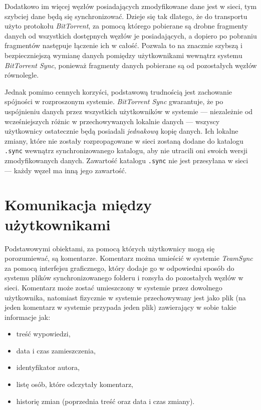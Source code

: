 \documentclass[polish,a4paper,twoside]{ppfcmthesis}
\begin{document}
Dodatkowo im więcej węzłów posiadających zmodyfikowane dane jest w sieci, tym szybciej dane będą się synchronizować. Dzieje się tak dlatego, że do transportu użyto protokołu \emph{BitTorrent}, za pomocą którego pobierane są drobne fragmenty danych od wszystkich dostępnych węzłów je posiadających, a dopiero po pobraniu fragmentów następuje łączenie ich w całość. Pozwala to na znacznie szybszą i bezpieczniejszą wymianę danych pomiędzy użytkownikami wewnątrz systemu \emph{BitTorrent Sync}, ponieważ fragmenty danych pobierane są od pozostałych węzłów równolegle.

Jednak pomimo cennych korzyści, podstawową trudnością jest zachowanie spójności w rozproszonym systemie. \emph{BitTorrent Sync} gwarantuje, że po uspójnieniu danych przez wszystkich użytkowników w systemie --- niezależnie od wcześniejszych różnic w przechowywanych lokalnie danych --- wszyscy użytkownicy ostatecznie będą posiadali \emph{jednakową} kopię danych. Ich lokalne zmiany, które nie zostały rozpropagowane w sieci zostaną dodane do katalogu \texttt{.sync} wewnątrz synchronizowanego katalogu, aby nie utracili oni swoich wersji zmodyfikowanych danych. Zawartość katalogu \texttt{.sync} nie jest przesyłana w sieci --- każdy węzeł ma inną jego zawartość.

\section*{Komunikacja między użytkownikami}

Podstawowymi obiektami, za pomocą których użytkownicy mogą się porozumiewać, są komentarze. Komentarz można umieścić w systemie \emph{TeamSync} za pomocą interfejsu graficznego, który dodaje go w odpowiedni sposób do systemu plików synchronizowanego folderu i rozsyła do pozostałych węzłów w sieci. Komentarz może zostać umieszczony w systemie przez dowolnego użytkownika, natomiast fizycznie w systemie przechowywany jest jako plik (na jeden komentarz w systemie przypada jeden plik) zawierający w sobie takie informacje jak:

\begin{itemize}[noitemsep]
 \item treść wypowiedzi,
 \item data i czas zamieszczenia,
 \item identyfikator autora,
 \item listę osób, które odczytały komentarz,
 \item historię zmian (poprzednia treść oraz data i czas zmiany).
\end{itemize}
\end{document}
